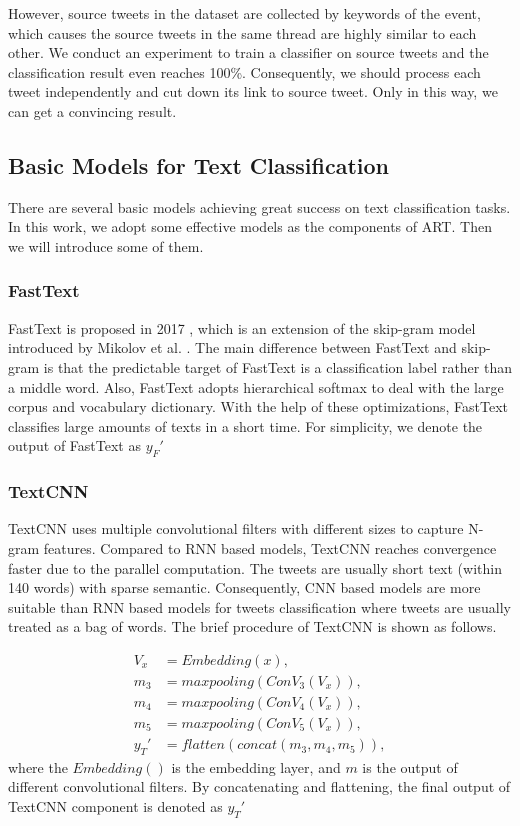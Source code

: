 However, source tweets in the dataset are collected by keywords of the event, which causes the source tweets in the same thread are highly similar to each other. We conduct an experiment to train a classifier on source tweets and the classification result even reaches 100\%. Consequently, we should process each tweet independently and cut down its link to source tweet. Only in this way, we can get a convincing result. 

\subsection{Basic Models for Text Classification}
\label{sec:deeplearning_model} There are several basic models achieving great success on text classification tasks.  In this work, we adopt some effective models as the components of ART. Then we will introduce some of them.

\subsubsection{FastText}
FastText is proposed in 2017 \cite{DBLP:journals/tacl/BojanowskiGJM17, DBLP:journals/corr/JoulinGBDJM16, DBLP:conf/eacl/GraveMJB17}, which is an extension of the skip-gram model introduced by Mikolov et al. \cite{DBLP:conf/nips/MikolovSCCD13}. The main difference between FastText and skip-gram is that the predictable target of FastText is a classification label rather than a middle word. Also, FastText adopts hierarchical softmax to deal with the large corpus and vocabulary dictionary. With the help of these optimizations, FastText classifies large amounts of texts in a short time. For simplicity, we denote the output of FastText as $y_F'$ 

\subsubsection{TextCNN}
TextCNN uses multiple convolutional filters with different sizes to capture N-gram features. Compared to RNN based models, TextCNN reaches convergence faster due to the parallel computation. The tweets are usually short text (within 140 words) with sparse semantic. Consequently, CNN based models are more suitable than RNN based models for tweets classification where tweets are usually treated as a bag of words. The brief procedure of TextCNN is shown as follows.

\begin{align}\label{eq:tcnn}
V_x &= Embedding(x), \\
m_3 &= maxpooling(ConV_3(V_x)),\\
m_4 &= maxpooling(ConV_4(V_x)),\\
m_5 &= maxpooling(ConV_5(V_x)),\\
y_T' &= flatten(concat(m_3, m_4, m_5)),
\end{align}
where the $Embedding()$ is the embedding layer, and $m$ is the output of different convolutional filters. By concatenating and flattening, the final output of TextCNN component is denoted as $y_T'$

